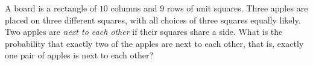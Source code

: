 A board is a rectangle of $10$ columns and $9$ rows of unit squares. Three apples are placed on three different squares, with all choices of three squares equally likely. Two apples are \emph{next to each other} if their squares share a side. What is the probability that exactly two of the apples are next to each other, that is, exactly one pair of apples is next to each other?
